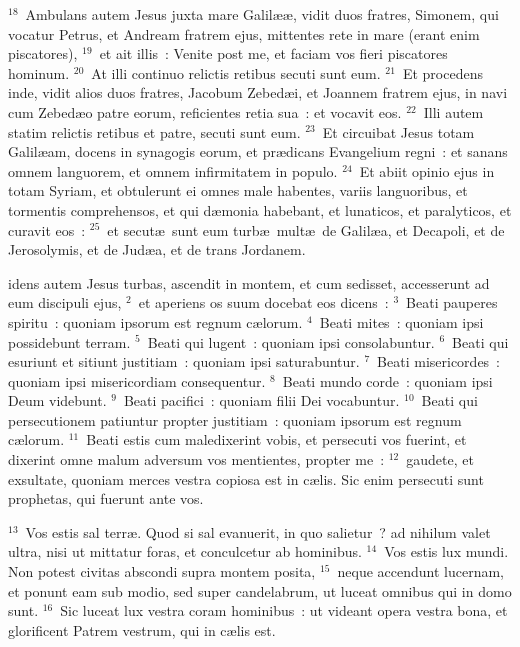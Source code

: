 ${}^{18}$~Ambulans autem Jesus juxta mare Galil\ae \ae , vidit duos fratres, Simonem, qui vocatur Petrus, et Andream fratrem ejus, mittentes rete in mare (erant enim piscatores),
${}^{19}$~et ait illis~: Venite post me, et faciam vos fieri piscatores hominum.
${}^{20}$~At illi continuo relictis retibus secuti sunt eum.
${}^{21}$~Et procedens inde, vidit alios duos fratres, Jacobum Zebed\ae i, et Joannem fratrem ejus, in navi cum Zebed\ae o patre eorum, reficientes retia sua~: et vocavit eos.
${}^{22}$~Illi autem statim relictis retibus et patre, secuti sunt eum.
${}^{23}$~Et circuibat Jesus totam Galil\ae am, docens in synagogis eorum, et pr\ae dicans Evangelium regni~: et sanans omnem languorem, et omnem infirmitatem in populo.
${}^{24}$~Et abiit opinio ejus in totam Syriam, et obtulerunt ei omnes male habentes, variis languoribus, et tormentis comprehensos, et qui d\ae monia habebant, et lunaticos, et paralyticos, et curavit eos~:
${}^{25}$~et secut\ae\ sunt eum turb\ae\ mult\ae\ de Galil\ae a, et Decapoli, et de Jerosolymis, et de Jud\ae a, et de trans Jordanem.

\bchapter
{}idens autem Jesus turbas, ascendit in montem, et cum sedisset, accesserunt ad eum discipuli ejus,
${}^{2}$~et aperiens os suum docebat eos dicens~:
${}^{3}$~Beati pauperes spiritu~: quoniam ipsorum est regnum c\ae lorum.
${}^{4}$~Beati mites~: quoniam ipsi possidebunt terram.
${}^{5}$~Beati qui lugent~: quoniam ipsi consolabuntur.
${}^{6}$~Beati qui esuriunt et sitiunt justitiam~: quoniam ipsi saturabuntur.
${}^{7}$~Beati misericordes~: quoniam ipsi misericordiam consequentur.
${}^{8}$~Beati mundo corde~: quoniam ipsi Deum videbunt.
${}^{9}$~Beati pacifici~: quoniam filii Dei vocabuntur.
${}^{10}$~Beati qui persecutionem patiuntur propter justitiam~: quoniam ipsorum est regnum c\ae lorum.
${}^{11}$~Beati estis cum maledixerint vobis, et persecuti vos fuerint, et dixerint omne malum adversum vos mentientes, propter me~:
${}^{12}$~gaudete, et exsultate, quoniam merces vestra copiosa est in c\ae lis. Sic enim persecuti sunt prophetas, qui fuerunt ante vos.


${}^{13}$~Vos estis sal terr\ae . Quod si sal evanuerit, in quo salietur~? ad nihilum valet ultra, nisi ut mittatur foras, et conculcetur ab hominibus.
${}^{14}$~Vos estis lux mundi. Non potest civitas abscondi supra montem posita,
${}^{15}$~neque accendunt lucernam, et ponunt eam sub modio, sed super candelabrum, ut luceat omnibus qui in domo sunt.
${}^{16}$~Sic luceat lux vestra coram hominibus~: ut videant opera vestra bona, et glorificent Patrem vestrum, qui in c\ae lis est.


